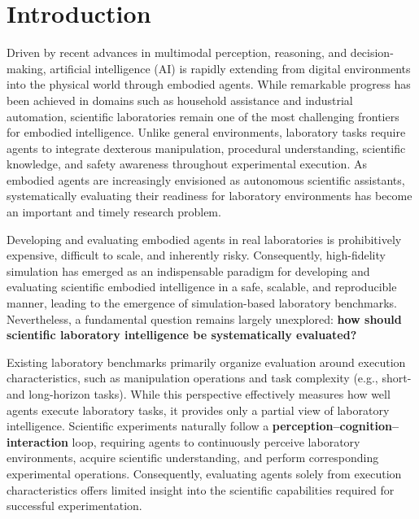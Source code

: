 \documentclass[sigconf]{acmart}
\begin{document}


\maketitle

\section{Introduction}

Driven by recent advances in multimodal perception, reasoning, and decision-making, artificial intelligence (AI) is rapidly extending from digital environments into the physical world through embodied agents. While remarkable progress has been achieved in domains such as household assistance and industrial automation, scientific laboratories remain one of the most challenging frontiers for embodied intelligence. Unlike general environments, laboratory tasks require agents to integrate dexterous manipulation, procedural understanding, scientific knowledge, and safety awareness throughout experimental execution. As embodied agents are increasingly envisioned as autonomous scientific assistants, systematically evaluating their readiness for laboratory environments has become an important and timely research problem.

Developing and evaluating embodied agents in real laboratories is prohibitively expensive, difficult to scale, and inherently risky. Consequently, high-fidelity simulation has emerged as an indispensable paradigm for developing and evaluating scientific embodied intelligence in a safe, scalable, and reproducible manner, leading to the emergence of simulation-based laboratory benchmarks. Nevertheless, a fundamental question remains largely unexplored: \textbf{how should scientific laboratory intelligence be systematically evaluated?}

Existing laboratory benchmarks primarily organize evaluation around execution characteristics, such as manipulation operations and task complexity (e.g., short- and long-horizon tasks). While this perspective effectively measures how well agents execute laboratory tasks, it provides only a partial view of laboratory intelligence. Scientific experiments naturally follow a \textbf{perception--cognition--interaction} loop, requiring agents to continuously perceive laboratory environments, acquire scientific understanding, and perform corresponding experimental operations. Consequently, evaluating agents solely from execution characteristics offers limited insight into the scientific capabilities required for successful experimentation.
\end{document}
